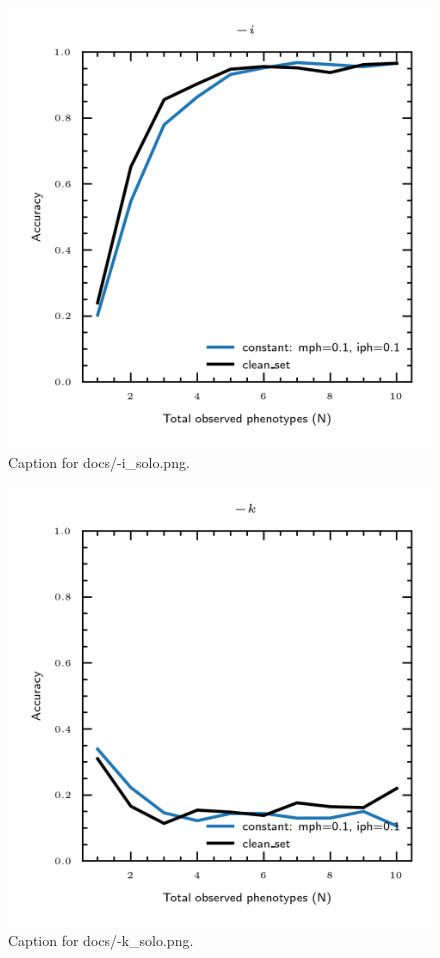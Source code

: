 \documentclass{article}
\begin{document}
\begin{figure}[h] \centering \includegraphics{docs/-i_solo.png} \caption{Caption for docs/-i_solo.png.} \end{figure}
\begin{figure}[h] \centering \includegraphics{docs/-k_solo.png} \caption{Caption for docs/-k_solo.png.} \end{figure}
\end{document}
